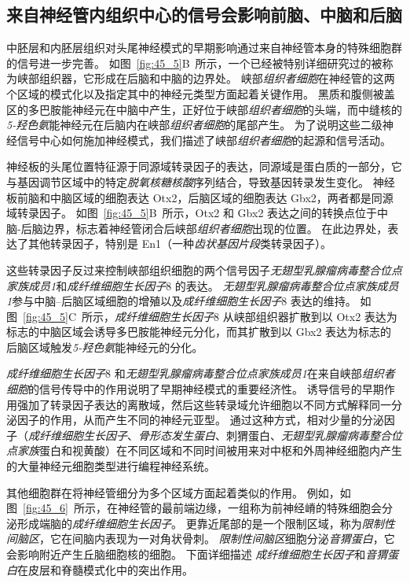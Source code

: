 \subsection{来自神经管内组织中心的信号会影响前脑、中脑和后脑}

中胚层和内胚层组织对头尾神经模式的早期影响通过来自神经管本身的特殊细胞群的信号进一步完善。
如图~\ref{fig:45_5}B~所示，一个已经被特别详细研究过的被称为峡部组织器，它形成在后脑和中脑的边界处。
峡部\textit{组织者细胞}在神经管的这两个区域的模式化以及指定其中的神经元类型方面起着关键作用。
黑质和腹侧被盖区的多巴胺能神经元在中脑中产生，正好位于峡部\textit{组织者细胞}的头端，而中缝核的\textit{5-羟色氨}能神经元在后脑内在峡部\textit{组织者细胞}的尾部产生。
为了说明这些二级神经信号中心如何施加神经模式，我们描述了峡部\textit{组织者细胞}的起源和信号活动。


神经板的头尾位置特征源于同源域转录因子的表达，同源域是蛋白质的一部分，它与基因调节区域中的特定\textit{脱氧核糖核酸}序列结合，导致基因转录发生变化。
神经板前脑和中脑区域的细胞表达 Otx2，后脑区域的细胞表达 Gbx2，两者都是同源域转录因子。
如图~\ref{fig:45_5}B~所示，Otx2 和 Gbx2 表达之间的转换点位于中脑-后脑边界，标志着神经管闭合后峡部\textit{组织者细胞}出现的位置。
在此边界处，表达了其他转录因子，特别是 En1（一种\textit{齿状基因片段}类转录因子）。


这些转录因子反过来控制峡部组织细胞的两个信号因子\textit{无翅型乳腺瘤病毒整合位点家族成员1}和\textit{成纤维细胞生长因子}8 的表达。
\textit{无翅型乳腺瘤病毒整合位点家族成员1}参与中脑--后脑区域细胞的增殖以及\textit{成纤维细胞生长因子}8 表达的维持。
如图~\ref{fig:45_5}C~所示，\textit{成纤维细胞生长因子}8 从峡部组织器扩散到以 Otx2 表达为标志的中脑区域会诱导多巴胺能神经元分化，而其扩散到以 Gbx2 表达为标志的后脑区域触发\textit{5-羟色氨}能神经元的分化。


\textit{成纤维细胞生长因子}8 和\textit{无翅型乳腺瘤病毒整合位点家族成员1}在来自峡部\textit{组织者细胞}的信号传导中的作用说明了早期神经模式的重要经济性。
诱导信号的早期作用强加了转录因子表达的离散域，然后这些转录域允许细胞以不同方式解释同一分泌因子的作用，从而产生不同的神经元亚型。
通过这种方式，相对少量的分泌因子（\textit{成纤维细胞生长因子}、\textit{骨形态发生蛋白}、刺猬蛋白、\textit{无翅型乳腺瘤病毒整合位点家族}蛋白和视黄酸）在不同区域和不同时间被用来对中枢和外周神经细胞内产生的大量神经元细胞类型进行编程神经系统。


其他细胞群在将神经管细分为多个区域方面起着类似的作用。
例如，如图~\ref{fig:45_6}~所示，在神经管的最前端边缘，一组称为前神经嵴的特殊细胞会分泌形成端脑的\textit{成纤维细胞生长因子}。
更靠近尾部的是一个限制区域，称为\textit{限制性间脑区}，它在间脑内表现为一对角状骨刺。
\textit{限制性间脑区}细胞分泌\textit{音猬蛋白}，它会影响附近产生丘脑细胞核的细胞。
下面详细描述 \textit{成纤维细胞生长因子}和\textit{音猬蛋白}在皮层和脊髓模式化中的突出作用。


